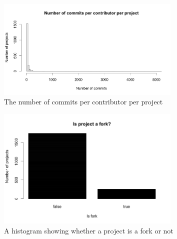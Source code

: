 


	    \begin{figure}[h!]
	        \includegraphics[width=250pt]{figures/nr-commits-per-contributor}
	        \caption{The number of commits per contributor per project}
	        \label{fig:nr-commit-contributor-plot}
	    \end{figure}

	    \begin{figure}[h!]
	        \includegraphics[width=250pt]{figures/isfork-per-project}
	        \caption{A histogram showing whether a project is a fork or not}
	        \label{fig:is-fork-plot}
	    \end{figure}

